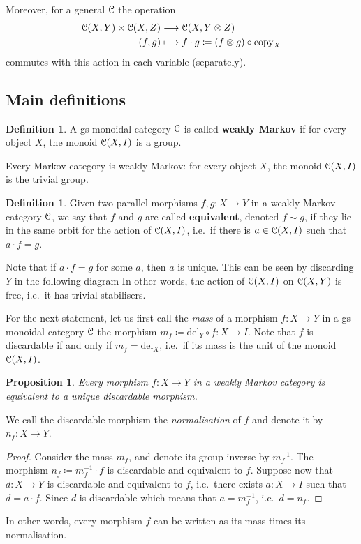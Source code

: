 \documentclass[a4paper,UKenglish,numberwithinsect,cleveref, autoref, thm-restate]{lipics-v2021}
\theoremstyle{plain} %
\newtheorem{myproposition}[mytheorem]{Proposition}
\theoremstyle{definition} %
\newtheorem{mydefinition}[mytheorem]{Definition}
\begin{document}
Moreover, for a general $\mathcal{C}$ the operation
\begin{align*}
	\mathcal{C}(X,Y) \times \mathcal{C}(X,Z) & \longrightarrow \mathcal{C}(X,Y \otimes Z)		\\
	(f,g) & \longmapsto f\cdot g \coloneqq (f\otimes g)\circ\mathrm{copy}_X
\end{align*}
commutes with this action in each variable (separately). 

\subsection{Main definitions}


\begin{mydefinition}\label{defweaklymarkov}
 A gs-monoidal category $\mathcal{C}$ is called \textbf{weakly Markov} if for every object $X$, the monoid $\mathcal{C}(X,I)$ is a group. 
\end{mydefinition}
%
Every Markov category is weakly Markov: for every object $X$, the monoid $\mathcal{C}(X,I)$ is the trivial group.

\begin{mydefinition}
 Given two parallel morphisms $f,g:X\to Y$ in a weakly Markov category $\mathcal{C}$, we say that $f$ and $g$ are called \textbf{equivalent}, denoted $f\sim g$, if they lie in the same orbit for the action of $\mathcal{C}(X,I)$, i.e.~if there is $a\in \mathcal{C}(X,I)$ such that $a\cdot f=g$.
\end{mydefinition}
%
Note that if $a\cdot f=g$ for some $a$, then $a$ is unique. This can be seen by discarding $Y$ in the following diagram
In other words, the action of $\mathcal{C}(X,I)$ on $\mathcal{C}(X,Y)$ is free, i.e.~it has trivial stabilisers.

For the next statement, let us first call the \emph{mass} of a morphism $f:X\to Y$ in a gs-monoidal category $\mathcal{C}$ 
the morphism $m_f\coloneqq \mathrm{del}_Y\circ f:X\to I$.
Note that $f$ is discardable if and only if $m_f=\mathrm{del}_X$, i.e.~if its mass is the unit of the monoid $\mathcal{C}(X,I)$.

\begin{myproposition}\label{weaklydiscardable}
 Every morphism $f:X\to Y$ in a weakly Markov category is equivalent to a unique discardable morphism.
\end{myproposition}
We call the discardable morphism the \emph{normalisation} of $f$ and denote it by $n_f:X\to Y$.
\begin{proof}
 Consider the mass $m_f$, and denote its group inverse by $m_f^{-1}$. The morphism $n_f\coloneqq m_f^{-1}\cdot f$ is discardable and equivalent to $f$.
 Suppose now that $d:X\to Y$ is discardable and equivalent to $f$, i.e.~there exists $a:X\to I$ such that $d = a\cdot f$. 
 Since $d$ is discardable
 which means that $a=m_f^{-1}$, i.e.~$d=n_f$. 
\end{proof}
In other words, every morphism $f$ can be written as its mass times its normalisation. 
\end{document}
